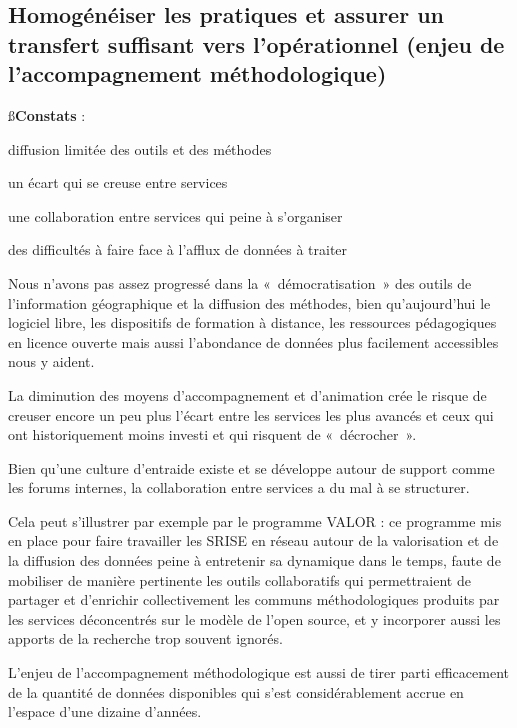 \subsection
{Homogénéiser les pratiques et assurer un transfert suffisant vers
l'opérationnel (enjeu de l'accompagnement méthodologique)}

{\ss\bf Constats} :

\startitemize

\item diffusion limitée des outils et des méthodes

\item un écart qui se creuse entre services

\item une collaboration entre services qui peine à s'organiser

\item des difficultés à faire face à l'afflux de données à traiter

\stopitemize

Nous n'avons pas assez progressé dans la « démocratisation » des outils de
l'information géographique et la diffusion des méthodes, bien qu'aujourd'hui
le logiciel libre, les dispositifs de formation à distance, les ressources
pédagogiques en licence ouverte mais aussi l'abondance de données plus
facilement accessibles nous y aident.

La diminution des moyens d'accompagnement et d'animation crée le risque de
creuser encore un peu plus l'écart entre les services les plus avancés et ceux
qui ont historiquement moins investi et qui risquent de « décrocher ».

Bien qu'une culture d'entraide existe et se développe autour de support comme
les forums internes, la collaboration entre services a du mal à se structurer.

Cela peut s'illustrer par exemple par le programme VALOR : ce programme mis en
place pour faire travailler les SRISE en réseau autour de la valorisation et
de la diffusion des données peine à entretenir sa dynamique dans le temps,
faute de mobiliser de manière pertinente les outils collaboratifs qui
permettraient de partager et d'enrichir collectivement les communs
méthodologiques produits par les services déconcentrés sur le modèle de l'open
source, et y incorporer aussi les apports de la recherche trop souvent
ignorés.

L'enjeu de l'accompagnement méthodologique est aussi de tirer parti
efficacement de la quantité de données disponibles qui s’est considérablement
accrue en l'espace d'une dizaine d'années.

